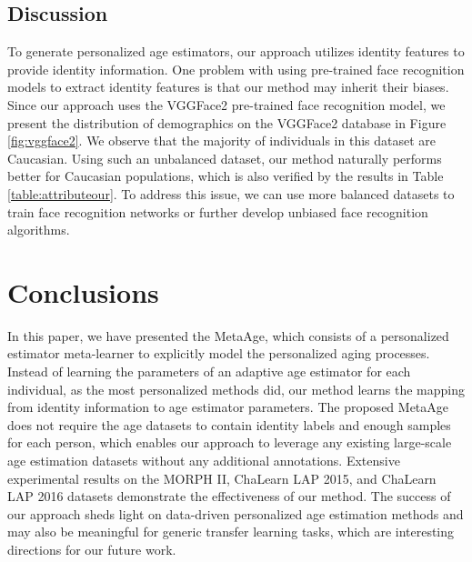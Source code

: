 \documentclass[journal,twoside]{IEEEtran}
\begin{document}
\subsection{Discussion}
To generate personalized age estimators, our approach utilizes identity features to provide identity information. One problem with using pre-trained face recognition models to extract identity features is that our method may inherit their biases. Since our approach uses the VGGFace2 pre-trained face recognition model, we present the distribution of demographics on the VGGFace2 database in Figure \ref{fig:vggface2}. We observe that the majority of individuals in this dataset are Caucasian. Using such an unbalanced dataset, our method naturally performs better for Caucasian populations, which is also verified by the results in Table \ref{table:attributeour}. To address this issue, we can use more balanced datasets to train face recognition networks or further develop unbiased face recognition algorithms.




  


\section{Conclusions}

In this paper, we have presented the MetaAge, which consists of a personalized estimator meta-learner to explicitly model the personalized aging processes. Instead of learning the parameters of an adaptive age estimator for each individual, as the most personalized methods did, our method learns the mapping from identity information to age estimator parameters.
The proposed MetaAge does not require the age datasets to contain identity labels and enough samples for each person,  which enables our approach to leverage any existing large-scale age estimation datasets without any additional annotations. Extensive experimental results on the MORPH II, ChaLearn LAP 2015, and ChaLearn LAP 2016 datasets demonstrate the effectiveness of our method.
The success of our approach sheds light on data-driven personalized age estimation methods and may also be meaningful for generic transfer learning tasks, which are interesting directions for our future work.



{


}



  
  
  






  
  
\end{document}
